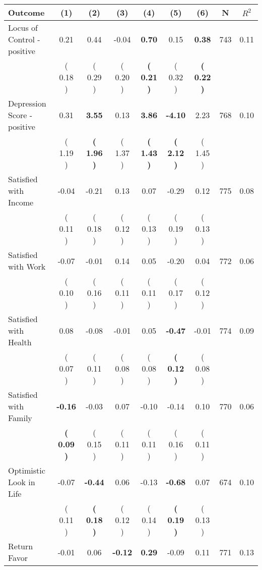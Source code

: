 \begin{tabular}{lcccccccc}
\toprule
 \textbf{Outcome} & \textbf{(1)} & \textbf{(2)} & \textbf{(3)} & \textbf{(4)} & \textbf{(5)} & \textbf{(6)} & \textbf{N} & \textbf{$ R^2$} \\
\midrule
Locus of Control - positive &      0.21 &      0.44 &     -0.04 & \textbf{     0.70} &      0.15 & \textbf{     0.38} & 743 &       0.11 \\ 
 & (     0.18 ) & (     0.29 ) & (     0.20 ) & \textbf{(     0.21 )} & (     0.32 ) & \textbf{(     0.22 )} & \\
Depression Score - positive &      0.31 & \textbf{     3.55} &      0.13 & \textbf{     3.86} & \textbf{    -4.10} &      2.23 & 768 &       0.10 \\ 
 & (     1.19 ) & \textbf{(     1.96 )} & (     1.37 ) & \textbf{(     1.43 )} & \textbf{(     2.12 )} & (     1.45 ) & \\
Satisfied with Income &     -0.04 &     -0.21 &      0.13 &      0.07 &     -0.29 &      0.12 & 775 &       0.08 \\ 
 & (     0.11 ) & (     0.18 ) & (     0.12 ) & (     0.13 ) & (     0.19 ) & (     0.13 ) & \\
Satisfied with Work &     -0.07 &     -0.01 &      0.14 &      0.05 &     -0.20 &      0.04 & 772 &       0.06 \\ 
 & (     0.10 ) & (     0.16 ) & (     0.11 ) & (     0.11 ) & (     0.17 ) & (     0.12 ) & \\
Satisfied with Health &      0.08 &     -0.08 &     -0.01 &      0.05 & \textbf{    -0.47} &     -0.01 & 774 &       0.09 \\ 
 & (     0.07 ) & (     0.11 ) & (     0.08 ) & (     0.08 ) & \textbf{(     0.12 )} & (     0.08 ) & \\
Satisfied with Family & \textbf{    -0.16} &     -0.03 &      0.07 &     -0.10 &     -0.14 &      0.10 & 770 &       0.06 \\ 
 & \textbf{(     0.09 )} & (     0.15 ) & (     0.11 ) & (     0.11 ) & (     0.16 ) & (     0.11 ) & \\
Optimistic Look in Life &     -0.07 & \textbf{    -0.44} &      0.06 &     -0.13 & \textbf{    -0.68} &      0.07 & 674 &       0.10 \\ 
 & (     0.11 ) & \textbf{(     0.18 )} & (     0.12 ) & (     0.14 ) & \textbf{(     0.19 )} & (     0.13 ) & \\
Return Favor &     -0.01 &      0.06 & \textbf{    -0.12} & \textbf{     0.29} &     -0.09 &      0.11 & 771 &       0.13 \\ 

\end{tabular}
